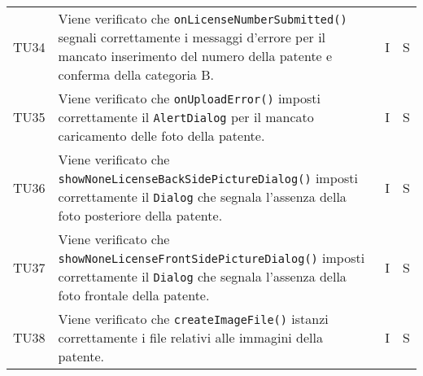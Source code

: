 \begin{longtable}{ >{\centering}p{}  >{\centering}p{} >{\centering}p{}
			>{\centering}p{}}
		\tabularnewline	
		TU34 & Viene verificato che \texttt{onLicenseNumberSubmitted()} segnali correttamente i messaggi d'errore per il mancato inserimento del numero della patente e conferma della categoria B. & I & S
		\tabularnewline	
		TU35 & Viene verificato che \texttt{onUploadError()} imposti correttamente il \texttt{AlertDialog} per il mancato caricamento delle foto della patente. & I & S
		\tabularnewline	
		TU36 & Viene verificato che \texttt{showNoneLicenseBackSidePictureDialog()} imposti correttamente il \texttt{Dialog} che segnala l'assenza della foto posteriore della patente. & I & S
		\tabularnewline	
		TU37 & Viene verificato che \texttt{showNoneLicenseFrontSidePictureDialog()} imposti correttamente il \texttt{Dialog} che segnala l'assenza della foto frontale della patente. & I & S
		\tabularnewline	
		TU38 & Viene verificato che \texttt{createImageFile()} istanzi correttamente i file relativi alle immagini della patente. & I & S \tabularnewline	
		

\end{longtable}
